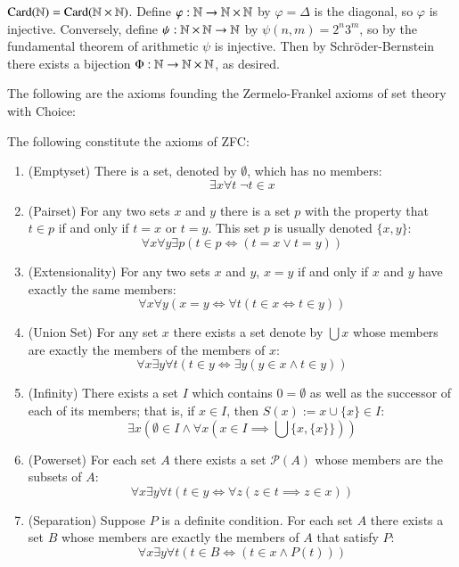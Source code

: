 \begin{subappendices}
    \begin{eg}
        $\text{Card}(\mathbb N) = \text{Card}(\mathbb N\times \mathbb N)$. Define $\varphi:\mathbb N\rightarrow \mathbb N\times \mathbb N$ by $\varphi = \Delta$ is the diagonal, so $\varphi$ is injective. Conversely, define $\psi:\mathbb N\times\mathbb N\rightarrow \mathbb N$ by $\psi(n,m) = 2^n3^m$, so by the fundamental theorem of arithmetic $\psi$ is injective. Then by Schr\"{o}der-Bernstein there exists a bijection $\Phi:\mathbb N\rightarrow \mathbb N\times \mathbb N$, as desired.
    \end{eg}

    The following are the axioms founding the Zermelo-Frankel axioms of set theory with Choice:

    \begin{axi}
        The following constitute the axioms of ZFC: \begin{enumerate}
            \item (Emptyset) There is a set, denoted by $\emptyset$, which has no members: $$\exists x\forall t\;\lnot t \in x$$
            \item (Pairset) For any two sets $x$ and $y$ there is a set $p$ with the property that $t \in p$ if and only if $t = x$ or $t = y$. This set $p$ is usually denoted $\{x,y\}$: $$\forall x\forall y\exists p(t \in p \iff (t = x\lor t = y))$$
            \item (Extensionality) For any two sets $x$ and $y$, $x = y$ if and only if $x$ and $y$ have exactly the same members: $$\forall x\forall y(x = y \iff \forall t(t \in x \iff t \in y))$$
            \item (Union Set) For any set $x$ there exists a set denote by $\bigcup x$ whose members are exactly the members of the members of $x$: $$\forall x \exists y\forall t(t \in y \iff \exists y(y \in x \land t \in y))$$
            \item (Infinity) There exists a set $I$ which contains $0 = \emptyset$ as well as the successor of each of its members; that is, if $x \in I$, then $S(x) := x \cup \{x\} \in I$: $$\exists x(\emptyset \in I \land \forall x(x \in I \implies \bigcup\{x,\{x\}\}))$$
            \item (Powerset) For each set $A$ there exists a set $\mathcal{P}(A)$ whose members are the subsets of $A$: $$\forall x \exists y\forall t(t \in y \iff \forall z(z \in t \implies z \in x))$$
            \item (Separation) Suppose $P$ is a definite condition. For each set $A$ there exists a set $B$ whose members are exactly the members of $A$ that satisfy $P$: $$\forall x \exists y \forall t(t \in B \iff (t \in x \land P(t)))$$

\end{enumerate}
\end{axi}
\end{subappendices}
